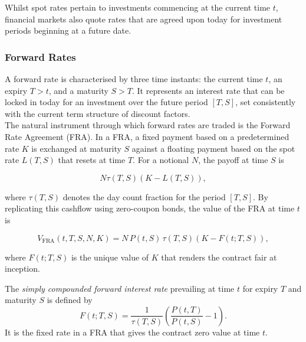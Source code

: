     \noindent
    Whilst spot rates pertain to investments commencing at the current time $t$, financial markets also quote rates that are agreed upon today for investment periods beginning at a future date.  \\
    
    \subsubsection*{Forward Rates}
        \noindent
         A forward rate is characterised by three time instants: the current time $t$, an expiry $T > t$, and a maturity $S > T$. It represents an interest rate that can be locked in today for an investment over the future period $[T, S]$, set consistently with the current term structure of discount factors. \\
    
        \noindent
        The natural instrument through which forward rates are traded is the Forward Rate Agreement (FRA). In a FRA, a fixed payment based on a predetermined rate $K$ is exchanged at maturity $S$
        against a floating payment based on the spot rate $L(T,S)$ that resets at time $T$. For a notional $N$, the payoff at time $S$ is
        
        \begin{equation} \label{eq:fra_payoff}
          N \tau(T,S)(K - L(T,S)),
        \end{equation}
        
        \noindent
        where $\tau(T,S)$ denotes the day count fraction for the period $[T,S]$. By replicating this cashflow using zero-coupon bonds, the value of the FRA at time $t$ is \cite{BrigoMercurio2006}
        
        \begin{equation} \label{eq:fra_value}
          V_{\text{FRA}}(t, T, S, N, K) = N \, P(t, S) \, \tau(T,S) \left(K - F(t; T, S)\right),
        \end{equation}
        
        \noindent
        where $F(t; T, S)$ is the unique value of $K$ that renders the contract fair at inception.
        
        \begin{definition}
        The \textit{simply compounded forward interest rate} prevailing at time $t$ for expiry $T$ and maturity $S$ is defined by
        \begin{equation}\label{eq:fwd_rate}
          F(t; T, S) = \frac{1}{\tau(T,S)} \left( \frac{P(t,T)}{P(t,S)} - 1 \right).
        \end{equation}
        It is the fixed rate in a FRA that gives the contract zero value at time $t$.
        \end{definition}
        
